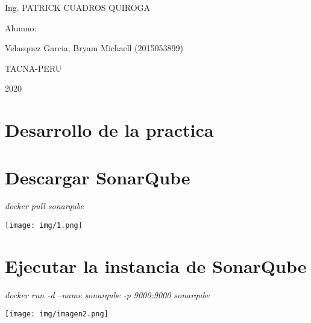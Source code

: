 \documentclass[12pt,letterpaper]{article}
\begin{document}
\begin{titlepage}
\begin{center}
\vspace*{0.1in}
\begin{large}
Ing. PATRICK CUADROS QUIROGA\\
\end{large}

\vspace*{0.2in}
\vspace*{0.1in}
\begin{large}
Alumno: \\
\begin{flushleft}
Velasquez Garcia, Bryam Michaell		\hfill	(2015053899) \\

\end{flushleft}
\end{large}
\vspace*{0.1in}
\begin{large}
TACNA-PERU \\
\end{large}
\vspace*{0.1in}
\begin{large}
2020\\
\end{large}

\end{center}

\end{titlepage}

\tableofcontents %
\thispagestyle{empty} %
\newpage
\setcounter{page}{1} %


\section {Desarrollo de la practica} 
\section{Descargar SonarQube} 
\textit{docker pull sonarqube}
\begin{center}
    \texttt{[image: img/1.png]}  
\end{center}

\section{Ejecutar la  instancia de SonarQube} 
\textit{docker run -d --name sonarqube -p 9000:9000 sonarqube}

        \begin{center}
            \texttt{[image: img/imagen2.png]}  
        \end{center}
\end{document}
